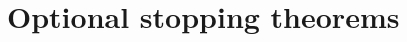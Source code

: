 \documentclass[../Main.tex]{subfiles}
\begin{document}









\section{Optional stopping theorems}
\end{document}
